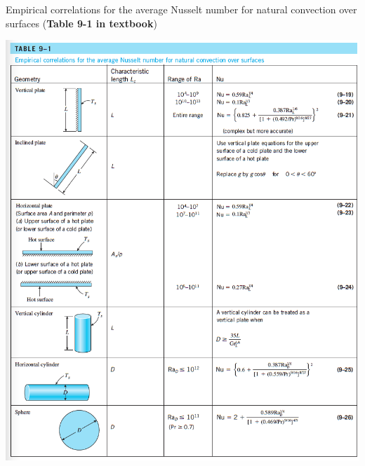 \begin{table}[H]
    \centering
    \caption{Empirical correlations for the average Nusselt number for natural convection over surfaces 
    (\textbf{Table 9-1 in textbook})}
    \includegraphics[width=1\textwidth]{Figures/sec9 table 9-1.png}
    \label{tab:sec9_natural_convection_over_surfaces}
\end{table}

